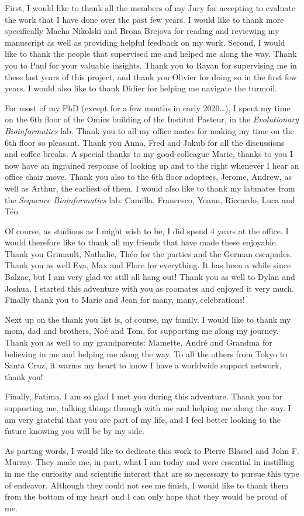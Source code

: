 First, I would like to thank all the members of my Jury for accepting to evaluate the work that I have done over the past few years. I would like to thank more specifically Macha Nikolski and Brona Brejova for reading and reviewing my manuscript as well as providing helpful feedback on my work. Second, I would like to thank the people that supervised me and helped me along the way. Thank you to Paul for your valuable insights. Thank you to Rayan for supervising me in these last years of this project, and thank you Olivier for doing so in the first few years. I would also like to thank Didier for helping me navigate the turmoil. 

For most of my PhD (except for a few months in early 2020…), I spent my time on the 6th  floor of the Omics building of the Institut Pasteur, in the \textit{Evolutionary Bioinformatics} lab. Thank you to all my office mates for making my time on the 6th floor so pleasant. Thank you Anna, Fred and Jakub for all the discussions and coffee breaks. A special thanks to my good-colleague Marie, thanks to you I now have an ingrained response of looking up and to the right whenever I hear an office chair move. Thank you also to the 6th floor adoptees, Jerome, Andrew, as well as Arthur, the earliest of them. I would also like to thank my labmates from the \textit{Sequence Bioinformatics} lab: Camilla, Francesco, Yoann, Riccardo, Luca and Téo. 

Of course, as studious as I might wish to be, I did spend 4 years at the office. I would therefore like to thank all my friends that have made these enjoyable. Thank you Grimault, Nathalie, Théo for the parties and the German escapades. Thank you as well Eva, Max and Flore for everything. It has been a while since Balzac, but I am very glad we still all hang out! Thank you as well to Dylan and Joshua, I started this adventure with you as roomates and enjoyed it very much. Finally thank you to Marie and Jean for many, many, celebrations!

Next up on the thank you list is, of course, my family. I would like to thank my mom, dad and brothers, Noé and Tom, for supporting me along my journey. Thank you as well to my grandparents: Mamette, André and Grandma for believing in me and helping me along the way. To all the others from Tokyo to Santa Cruz, it warms my heart to know I have a worldwide support network, thank you!

Finally, Fatima. I am so glad I met you during this adventure. Thank you for supporting me, talking things through with me and helping me along the way. I am very grateful that you are part of my life, and I feel better looking to the future knowing you will be by my side.

As parting words, I would like to dedicate this work to Pierre Blassel and John F. Murray. They made me, in part, what I am today and were essential in instilling in me the curiosity and scientific interest that are so necessary to pursue this type of endeavor. Although they could not see me finish, I would like to thank them from the bottom of my heart and I can only hope that they would be proud of me.
